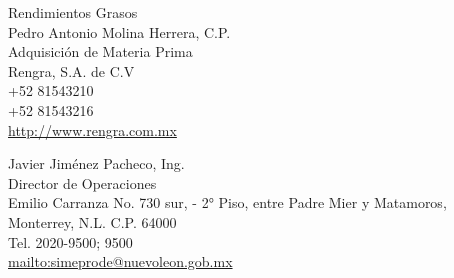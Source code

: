\begin{contact}[RENGRA]\label{contacto:RENGRA}
\noindent Rendimientos Grasos\\
Pedro Antonio Molina Herrera, C.P.\\
Adquisición de Materia Prima\\
Rengra, S.A. de C.V\\
+52 81543210\\
+52 81543216\\
\url{http://www.rengra.com.mx}
\end{contact}

\begin{contact}[SIMEPRODE]\label{contacto:SIMEPRODE}
\noindent Javier Jiménez Pacheco, Ing.\\
Director de Operaciones\\
Emilio Carranza No. 730 sur, - 2° Piso, entre Padre Mier y Matamoros,\\
Monterrey, N.L. C.P. 64000\\
Tel. 2020-9500; 9500\\
\url{mailto:simeprode@nuevoleon.gob.mx}
\end{contact}